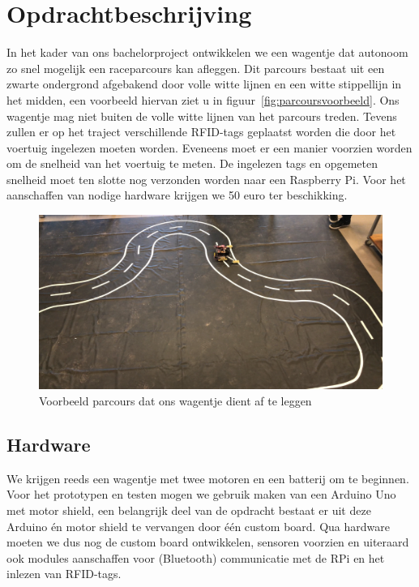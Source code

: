 \section{Opdrachtbeschrijving}
In het kader van ons bachelorproject ontwikkelen we een wagentje dat autonoom zo snel mogelijk een raceparcours kan afleggen. Dit parcours bestaat uit een zwarte ondergrond afgebakend door volle witte lijnen en een witte stippellijn in het midden, een voorbeeld hiervan ziet u in figuur~\vref{fig:parcoursvoorbeeld}. Ons wagentje mag niet buiten de volle witte lijnen van het parcours treden. Tevens zullen er op het traject verschillende RFID-tags geplaatst worden die door het voertuig ingelezen moeten worden. Eveneens moet er een manier voorzien worden om de snelheid van het voertuig te meten. De ingelezen tags en opgemeten snelheid moet ten slotte nog verzonden worden naar een Raspberry Pi. Voor het aanschaffen van nodige hardware krijgen we 50 euro ter beschikking.\\
\begin{figure}[H]
	\centering
	\includegraphics[width=\textwidth]{parcoursvoorbeeld.png}
	\caption{Voorbeeld parcours dat ons wagentje dient af te leggen}
	\label{fig:parcoursvoorbeeld}
\end{figure}
\subsection{Hardware}
We krijgen reeds een wagentje met twee motoren en een batterij om te beginnen.
Voor het prototypen en testen mogen we gebruik maken van een Arduino Uno met motor shield, een belangrijk deel van de opdracht bestaat er uit deze Arduino \'en motor shield te vervangen door \'e\'en custom board.
Qua hardware moeten we dus nog de custom board ontwikkelen, sensoren voorzien en uiteraard ook modules aanschaffen voor (Bluetooth) communicatie met de RPi en het inlezen van RFID-tags.\\
